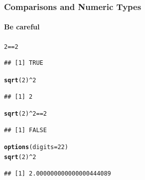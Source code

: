 \documentclass{beamer}\usepackage[]{graphicx}\usepackage[]{color}
\makeatletter
\newcommand{\hlnum}[1]{\textcolor[rgb]{0.686,0.059,0.569}{#1}}%
\newcommand{\hlopt}[1]{\textcolor[rgb]{0,0,0}{#1}}%
\newcommand{\hlstd}[1]{\textcolor[rgb]{0.345,0.345,0.345}{#1}}%
\newcommand{\hlkwc}[1]{\textcolor[rgb]{0.333,0.667,0.333}{#1}}%
\newcommand{\hlkwd}[1]{\textcolor[rgb]{0.737,0.353,0.396}{\textbf{#1}}}%
\newenvironment{kframe}{%
 \def\at@end@of@kframe{}%
 \ifinner\ifhmode%
  \def\at@end@of@kframe{\end{minipage}}%
  \begin{minipage}{\columnwidth}%
 \fi\fi%
 \def\FrameCommand##1{\hskip\@totalleftmargin \hskip-\fboxsep
 \colorbox{shadecolor}{##1}\hskip-\fboxsep
     \hskip-\linewidth \hskip-\@totalleftmargin \hskip\columnwidth}%
 \MakeFramed {\advance\hsize-\width
   \@totalleftmargin\z@ \linewidth\hsize
   \@setminipage}}%
 {\par\unskip\endMakeFramed%
 \at@end@of@kframe}
\newenvironment{knitrout}{}{} %
\makeatother
\begin{document}




\begin{frame}[fragile]
    \frametitle{Comparisons and Numeric Types}
    \framesubtitle{Be careful}



\begin{knitrout}\footnotesize
{}\color{fgcolor}\begin{kframe}
\begin{alltt}
\hlnum{2} \hlopt{==} \hlnum{2}
\end{alltt}
\begin{verbatim}
## [1] TRUE
\end{verbatim}
\begin{alltt}
\hlkwd{sqrt}\hlstd{(}\hlnum{2}\hlstd{)}\hlopt{^}\hlnum{2}
\end{alltt}
\begin{verbatim}
## [1] 2
\end{verbatim}
\begin{alltt}
\hlkwd{sqrt}\hlstd{(}\hlnum{2}\hlstd{)}\hlopt{^}\hlnum{2} \hlopt{==} \hlnum{2}
\end{alltt}
\begin{verbatim}
## [1] FALSE
\end{verbatim}
\begin{alltt}
\hlkwd{options}\hlstd{(}\hlkwc{digits} \hlstd{=} \hlnum{22}\hlstd{)}
\hlkwd{sqrt}\hlstd{(}\hlnum{2}\hlstd{)}\hlopt{^}\hlnum{2}
\end{alltt}
\begin{verbatim}
## [1] 2.000000000000000444089
\end{verbatim}
\end{kframe}
\end{knitrout}

\end{frame}
\end{document}
